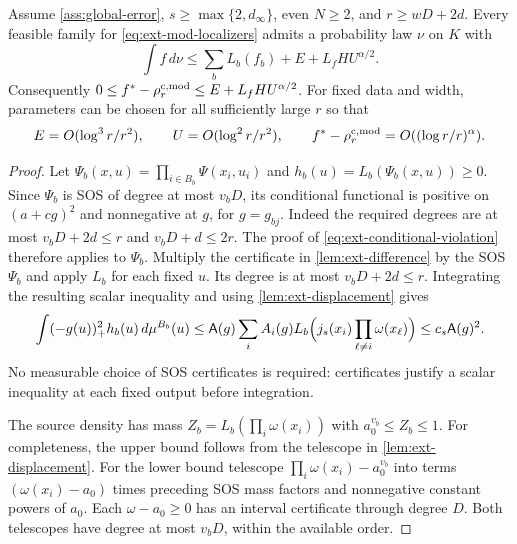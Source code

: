 \begin{theorem}\label{thm:constr-mod}
Assume \cref{ass:global-error}, $s\ge\max\{2,d_\infty\}$, even $N\ge2$,
and $r\ge wD+2d$. Every feasible family for
\eqref{eq:ext-mod-localizers} admits a probability law $\nu$ on $K$ with
\begin{equation}\label{eq:ext-mod-bound}
 \int f\,d\nu\le\sum_bL_b(f_b)+E+L_fH U^{\alpha/2}.
\end{equation}
Consequently $0\le f^{*}-\rho_r^{\mathrm{c,mod}}\le E+L_fH U^{\alpha/2}$.
For fixed data and width, parameters can be chosen for all sufficiently
large $r$ so that
\[
 E=O(\log^3r/r^2),\qquad U=O(\log^2r/r^2),\qquad
 f^{*}-\rho_r^{\mathrm{c,mod}}=O((\log r/r)^\alpha).
\]
\end{theorem}
\begin{proof}
Let $\Psi_b(x,u)=\prod_{i\in B_b}\Psi(x_i,u_i)$ and
$h_b(u)=L_b(\Psi_b(x,u))\ge0$. Since $\Psi_b$ is SOS of degree at most
$v_bD$, its conditional functional is positive on $(a+cg)^2$ and
nonnegative at $g$, for $g=g_{bj}$. Indeed the required degrees are at
most $v_bD+2d\le r$ and $v_bD+d\le2r$. The proof of
\eqref{eq:ext-conditional-violation} therefore applies to $\Psi_b$.
Multiply the certificate in \cref{lem:ext-difference} by the SOS
$\Psi_b$ and apply $L_b$ for each fixed $u$. Its degree is at most
$v_bD+2d\le r$. Integrating the resulting scalar inequality and using
\cref{lem:ext-displacement} gives
\begin{equation}\label{eq:ext-SOS-violation}
 \int(-g(u))_+^2h_b(u)\,d\mu^{B_b}(u)
 \le\mathsf{A}(g)\sum_i A_i(g)
 L_b\Bigl(j_s(x_i)\prod_{\ell\ne i}\omega(x_\ell)\Bigr)
 \le c_s\mathsf{A}(g)^2.
\end{equation}
No measurable choice of SOS certificates is required: certificates
justify a scalar inequality at each fixed output before integration.

The source density has mass
$Z_b=L_b(\prod_i\omega(x_i))$ with $a_0^{v_b}\le Z_b\le1$.
For completeness, the upper bound follows from the telescope in
\cref{lem:ext-displacement}. For the lower bound telescope
$\prod_i\omega(x_i)-a_0^{v_b}$ into terms
$(\omega(x_i)-a_0)$ times preceding SOS mass factors and nonnegative
constant powers of $a_0$. Each $\omega-a_0\ge0$ has an interval
certificate through degree $D$. Both telescopes have degree at most
$v_bD$, within the available order.


\end{proof}
